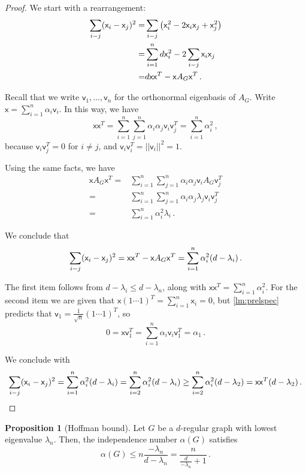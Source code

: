 \documentclass[12pt]{amsart}
\theoremstyle{definition}
\newtheorem{prop}[thm]{Proposition}
\newcommand{\vv}{\mathsf{v}}
\newcommand{\vx}{\mathsf{x}}
\begin{document}
\begin{proof}
We start with a rearrangement:
\begin{align*}
\sum_{i \-- j} (\vx_i - \vx_j)^2 =& \sum_{i \-- j}\left( \vx_i^2 - 2 \vx_i \vx_j + \vx_j^2\right) \\
=& \sum_{i= 1}^n d \vx_i^2 - 2\sum_{i\-- j} \vx_i \vx_j \\
=& d \vx \vx^T - \vx A_G \vx^T\, . 
\end{align*}

Recall that we write $\vv_1, \ldots , \vv_n$ for the orthonormal eigenbasis of $A_G$.
Write $\vx = \sum_{i=1}^n \alpha_i \vv_i$.
In this way, we have
$$\vx \vx^T = \sum_{i=1}^n \sum_{j=1}^n \alpha_i \alpha_j \vv_i \vv_j^T = \sum_{i=1}^n \alpha_i^2\, , $$
because $\vv_i \vv_j^T = 0$ for $i \neq j$, and $\vv_i \vv_i^T = ||\vv_i||^2 = 1$.

Using the same facts, we have
\begin{align*}
\vx A_G\vx^T =& \sum_{i=1}^n \sum_{j=1}^n \alpha_i \alpha_j \vv_i A_G\vv_j^T\\
=& \sum_{i=1}^n \sum_{j=1}^n \alpha_i \alpha_j \lambda_j \vv_i \vv_j^T \\
=&\sum_{i=1}^n  \alpha_i^2 \lambda_i\, . 
\end{align*}

We conclude that
$$ \sum_{i \-- j} (\vx_i - \vx_j)^2 = \vx \vx^T - \vx A_G \vx^T = \sum_{i=1}^n  \alpha_i^2 (d  - \lambda_i) \, . $$

The first item follows from $d  - \lambda_i \leq d  - \lambda_n$, along with $\vx \vx^T = \sum_{i=1}^n \alpha_i^2$.
For the second item we are given that $\vx (1 \cdots 1)^T = \sum_{i=1}^n \vx_i = 0$, but \cref{lm:prelspec} predicts that $\vv_1 = \frac{1}{\sqrt{n}} (1 \cdots 1)^T$, so
$$0 = \vx \vv_1^T = \sum_{i=1}^n \alpha_i \vv_i \vv_1^T = \alpha_1 \, .$$

We conclude with 
$$ \sum_{i \-- j} (\vx_i - \vx_j)^2 = \sum_{i=1}^n  \alpha_i^2 (d  - \lambda_i) = \sum_{i=2}^n  \alpha_i^2 (d  - \lambda_i) \geq \sum_{i=2}^n  \alpha_i^2 (d  - \lambda_2) = \vx \vx^T(d-\lambda_2) \, . $$
\end{proof}

\begin{prop}[Hoffman bound]\label{prop:indep_bound}
Let $G$ be a $d$-regular graph with lowest eigenvalue $\lambda_n$.
Then, the independence number $\alpha(G)$ satisfies
$$\alpha(G) \leq n \frac{-\lambda_n}{d - \lambda_n} = \frac{n}{\frac{d}{-\lambda_n} + 1}\, . $$
\end{prop}
\end{document}
